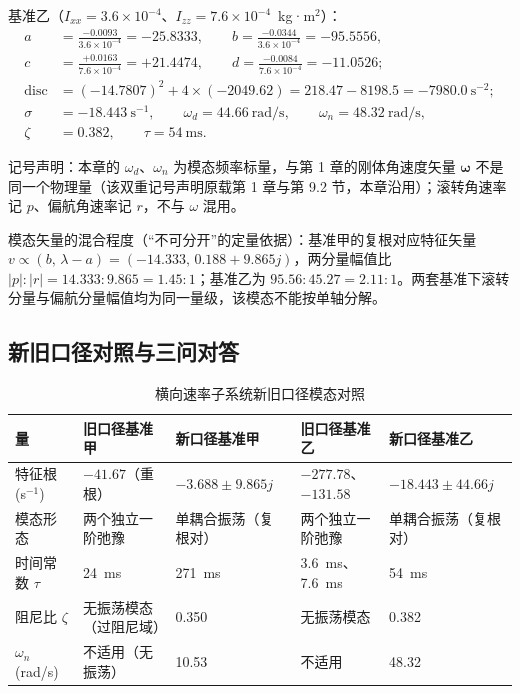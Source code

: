 \documentclass[11pt,a4paper]{ctexart}
\newcommand{\bvec}[1]{\boldsymbol{#1}}
\begin{document}
基准乙（$I_{xx}=3.6\times10^{-4}$、$I_{zz}=7.6\times10^{-4}$~kg·m$^2$）：
\begin{align*}
a&=\frac{-0.0093}{3.6\times10^{-4}}=-25.8333,\qquad
b=\frac{-0.0344}{3.6\times10^{-4}}=-95.5556,\\
c&=\frac{+0.0163}{7.6\times10^{-4}}=+21.4474,\qquad
d=\frac{-0.0084}{7.6\times10^{-4}}=-11.0526;\\
\mathrm{disc}&=(-14.7807)^2+4\times(-2049.62)=218.47-8198.5=-7980.0~\mathrm{s}^{-2};\\
\sigma&=-18.443~\mathrm{s}^{-1},\qquad
\omega_d=44.66~\mathrm{rad/s},\qquad
\omega_n=48.32~\mathrm{rad/s},\\
\zeta&=0.382,\qquad
\tau=54~\mathrm{ms}.
\end{align*}

记号声明：本章的 $\omega_d$、$\omega_n$ 为模态频率标量，与第 1 章的刚体角速度矢量 $\bvec{\omega}$ 不是同一个物理量（该双重记号声明原载第 1 章与第 9.2 节，本章沿用）；滚转角速率记 $p$、偏航角速率记 $r$，不与 $\omega$ 混用。

模态矢量的混合程度（“不可分开”的定量依据）：基准甲的复根对应特征矢量 $v\propto(b,\,\lambda-a)=(-14.333,\,0.188+9.865j)$，两分量幅值比 $|p|:|r|=14.333:9.865=1.45:1$；基准乙为 $95.56:45.27=2.11:1$。两套基准下滚转分量与偏航分量幅值均为同一量级，该模态不能按单轴分解。

\subsection{新旧口径对照与三问对答}

\begin{table}[htbp]
\centering\small
\begin{tabularx}{\textwidth}{lXXXX}
\toprule
量 & 旧口径基准甲 & 新口径基准甲 & 旧口径基准乙 & 新口径基准乙 \\
\midrule
特征根 (s$^{-1}$) & $-41.67$（重根） & $-3.688\pm9.865j$ & $-277.78$、$-131.58$ & $-18.443\pm44.66j$ \\
模态形态 & 两个独立一阶弛豫 & 单耦合振荡（复根对） & 两个独立一阶弛豫 & 单耦合振荡（复根对） \\
时间常数 $\tau$ & 24~ms & 271~ms & 3.6~ms、7.6~ms & 54~ms \\
阻尼比 $\zeta$ & 无振荡模态（过阻尼域） & 0.350 & 无振荡模态 & 0.382 \\
$\omega_n$ (rad/s) & 不适用（无振荡） & 10.53 & 不适用 & 48.32 \\
\bottomrule
\end{tabularx}
\caption{横向速率子系统新旧口径模态对照}
\end{table}
\end{document}
